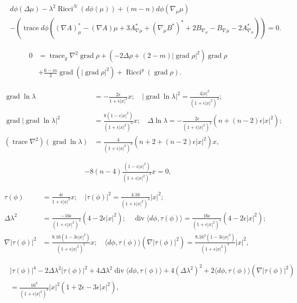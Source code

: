 \documentclass[12pt]{article}
\begin{document}
\begin{align*}
&d\phi(\Delta \mu) - \lambda^2 \operatorname{Ricci}^{N}(d\phi(\mu)) + (m-n) d\phi(\nabla_{\mu}\mu) \\
&- (\operatorname{trace} d\phi( (\nabla A)^{*}_{\mu} - (\nabla A)\mu + 3A^{*}_{\nabla \mu}
 + (\nabla_{\mu} B^{*})^{*} + 2 B_{\nabla_{\mu}}- B_{\nabla \mu} - 2 A^{*}_{\nabla_{\mu}} )) = 0.
\end{align*}

\begin{align*}
0 &= \operatorname{trace}_{g} \nabla^2 \operatorname{grad}\rho + (-2\Delta \rho + (2-m)|\operatorname{grad}\rho|^2) \operatorname{grad}\rho \\
&+ \tfrac{6-m}{2} \operatorname{grad} (|\operatorname{grad}\rho|^2 ) + \operatorname{Ricci}^{g}(\operatorname{grad}\rho) .
\end{align*}

\begin{align*}
\operatorname{grad} \ln\lambda &= -\tfrac{2\epsilon}{1+ \epsilon |x|^2} x ; \quad |\operatorname{grad} \ln\lambda|^2 = \tfrac{4|x|^2}{(1+ \epsilon |x|^2)^2}; \\
\operatorname{grad}|\operatorname{grad} \ln\lambda|^2 &= \tfrac{8(1- \epsilon |x|^2)}{(1+ \epsilon |x|^2)^3} x ; \quad
\Delta \ln\lambda = -\tfrac{2\epsilon}{(1+ \epsilon |x|^2)^2}(n + (n-2)\epsilon |x|^2) ;\\
(\operatorname{trace}\nabla^2) (\operatorname{grad}\ln\lambda)  &= \tfrac{4}{(1+ \epsilon |x|^2)^3}(n+2 +
(n-2)\epsilon|x|^2)x,
\end{align*}

$$-8(n-4)\tfrac{(1- \epsilon|x|^2)}{(1+ \epsilon |x|^2)^3} x =0 ,$$

\begin{align*}
\tau(\phi) &= \tfrac{4\epsilon}{1+ \epsilon |x|^2} x ; \quad |\tau(\phi)|^2 = \tfrac{4.16}{(1+ \epsilon |x|^2)^4} |x|^2 ;\\
\Delta \lambda^2 &= \tfrac{-16\epsilon}{(1+ \epsilon |x|^2)^4} (4-2\epsilon|x|^2) ; \quad
\operatorname{div} \langle d\phi ,\tau(\phi)\rangle  = \tfrac{16\epsilon}{(1+ \epsilon |x|^2)^4} (4-2\epsilon|x|^2) ;\\
\nabla |\tau(\phi)|^2 &= \tfrac{8.16(1-3\epsilon|x|^2)}{(1+\epsilon|x|^2)^5} x ;
\quad \langle d\phi ,\tau(\phi)\rangle (\nabla |\tau(\phi)|^2) = \tfrac{8.16^2
(1-3\epsilon|x|^2)}{(1+\epsilon|x|^2)^8} |x|^2 ,
\end{align*}

\begin{align*}
&|\tau(\phi)|^{4} - 2\Delta \lambda^{2} |\tau(\phi)|^{2} + 4 \Delta \lambda^{2}
\operatorname{div}{\langle d\phi , \tau(\phi)\rangle} + 4 (\Delta \lambda^{2})^{2} +
2 \langle d\phi , \tau(\phi) \rangle (\nabla |\tau(\phi)|^{2}) \\
&= \tfrac{16^3}{(1+\epsilon|x|^2)^8} |x|^2 (1+2 \epsilon -3\epsilon |x|^2),
\end{align*}
\end{document}
